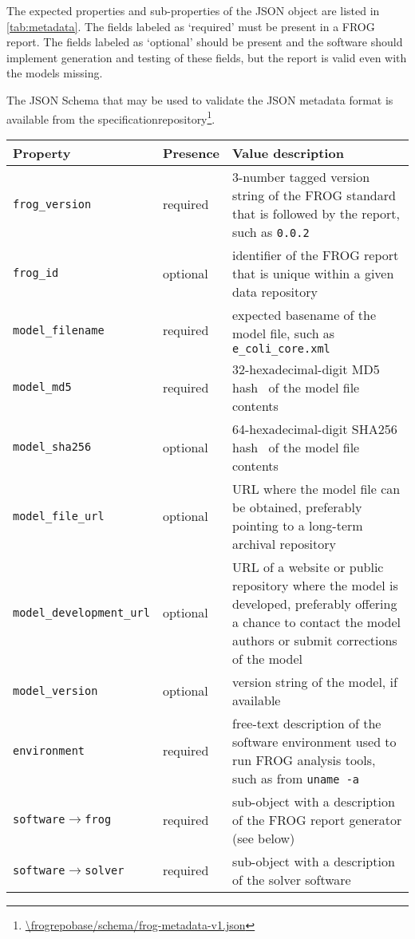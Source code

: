 The expected properties and sub-properties of the JSON object are listed in \cref{tab:metadata}. The fields labeled as `required' must be present in a FROG report. The fields labeled as `optional' should be present and the software should implement generation and testing of these fields, but the report is valid even with the models missing.

The JSON Schema that may be used to validate the JSON metadata format is available from the specificationrepository\footnote{\url{\frogrepobase/schema/frog-metadata-v1.json}}.

\begin{table}\tablefont
\begin{tabular}{llp{30em}}
\toprule
Property & Presence & Value description \\
\midrule
\verb|frog_version|
 & required
 & 3-number tagged version string of the FROG standard that is followed by the report, such as \verb|0.0.2|
 \\
\verb|frog_id|
 & optional
 & identifier of the FROG report that is unique within a given data repository
 \\
\verb|model_filename|
 & required
 & expected basename of the model file, such as \verb|e_coli_core.xml|
 \\
\verb|model_md5|
 & required
 & 32-hexadecimal-digit MD5 hash~\cite{rfc1321} of the model file contents
 \\
\verb|model_sha256|
 & optional
 & 64-hexadecimal-digit SHA256 hash~\cite{national2008secure} of the model file contents
 \\
\verb|model_file_url|
 & optional
 & URL where the model file can be obtained, preferably pointing to a long-term archival repository
 \\
\verb|model_development_url|
 & optional
 & URL of a website or public repository where the model is developed, preferably offering a chance to contact the model authors or submit corrections of the model
 \\
\verb|model_version|
 & optional
 & version string of the model, if available
 \\
\verb|environment|
 & required
 & free-text description of the software environment used to run FROG analysis tools, such as from \verb|uname -a|
 \\
\verb|software|$\to$\verb|frog|
 & required
 & sub-object with a description of the FROG report generator (see below)
 \\
\verb|software|$\to$\verb|solver|
 & required
 & sub-object with a description of the solver software

\end{tabular}
\end{table}
